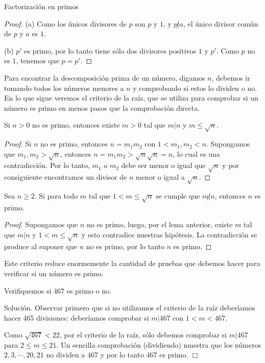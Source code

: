 \begin{section}{Factorización en primos}
\begin{proof}
\noindent (a) Como los únicos divisores de $p$ son $p$ y $1$, y $p{\not|}a$, el único  divisor común de $p$ y $a$ es $1$.

\noindent (b) $p'$ es primo, por lo tanto tiene sólo dos divisores positivos $1$ y $p'$. Como $p$ no es $1$, tenemos que  $p=p'$.
\end{proof}

Para encontrar la descomposición prima de un número, digamos $n$, debemos ir tomando todos los números menores a $n$ y comprobando si estos lo dividen o no. En lo que sigue veremos el criterio de la raíz, que se utiliza para comprobar si un número es primo en menos pasos que la comprobación directa.  

\begin{lema} Si $n>0$ no es primo, entonces existe $m>0$ tal que $m|n$ y $m \le \sqrt{n}$.  
\end{lema}
\begin{proof}
Si $n$ no es primo, entonces $n = m_1m_2$ con $1 < m_1,m_2 < n$. Supongamos que $m_1,m_2 > \sqrt n$, entonces $n = m_1m_2 >  \sqrt n\sqrt n = n$, lo cual es una contradicción. Por lo tanto, $m_1$ o $m_2$ debe ser menor o igual que $\sqrt n$ y por consiguiente encontramos un divisor de $n$ menor o igual a  $\sqrt n$. 
\end{proof}

\begin{proposicion}\label{craiz}Sea $n\ge 2$. Si para todo $m$ tal que $1<m \le \sqrt{n}$ se cumple que $m{\not|}n$, entonces $n$ es primo.
\end{proposicion}
 \begin{proof}  Supongamos que $n$ no es primo, luego, por el lema anterior, existe $m$ tal que  $m|n$ y $1 < m \le \sqrt n$ y esto contradice nuestras hipótesis. La contradicción se produce al suponer que $n$ no es primo, por lo tanto $n$ es primo. 
\end{proof}

Este criterio reduce enormemente la cantidad de pruebas que debemos hacer para verificar si un número es primo.

\begin{ejemplo} Verifiquemos si $467$ es primo o no.

{\sc Solución.} Observar primero que si no utilizamos el criterio de la raíz deberíamos hacer 465 divisiones: deberíamos comprobar si $m|467$ con  $1<m <467$. 

Como $\sqrt{467} < 22$, por el criterio de la raíz, sólo debemos comprobar si $m|467$ para $2\le m \le 21$. Un sencilla comprobación (dividiendo) muestra que los números $2,3,\cdots,20,21$ no  dividen a $467$ y por  lo tanto $467$ es primo. $\Box$
\end{ejemplo}




\end{section}

